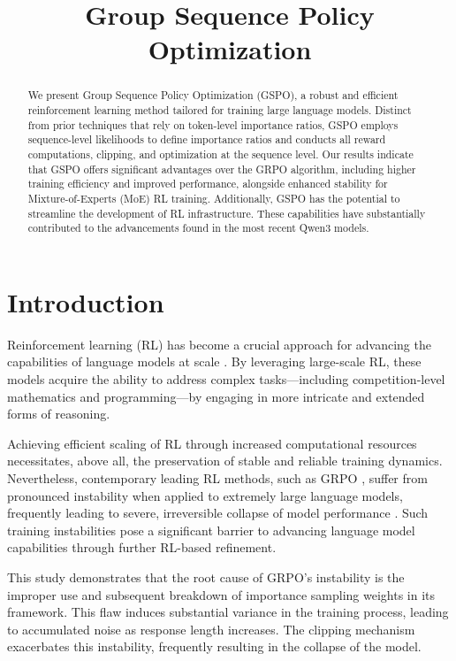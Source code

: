 \title{Group Sequence Policy Optimization}

\begin{abstract}
We present Group Sequence Policy Optimization (GSPO), a robust and efficient reinforcement learning method tailored for training large language models. Distinct from prior techniques that rely on token-level importance ratios, GSPO employs sequence-level likelihoods to define importance ratios and conducts all reward computations, clipping, and optimization at the sequence level. Our results indicate that GSPO offers significant advantages over the GRPO algorithm, including higher training efficiency and improved performance, alongside enhanced stability for Mixture-of-Experts (MoE) RL training. Additionally, GSPO has the potential to streamline the development of RL infrastructure. These capabilities have substantially contributed to the advancements found in the most recent Qwen3 models.
\end{abstract}

\section{Introduction}
\label{sec:intro}

Reinforcement learning (RL) has become a crucial approach for advancing the capabilities of language models at scale \citep{o1,dpsk-r1,qwq32b,qwen3}. By leveraging large-scale RL, these models acquire the ability to address complex tasks—including competition-level mathematics and programming—by engaging in more intricate and extended forms of reasoning.

Achieving efficient scaling of RL through increased computational resources necessitates, above all, the preservation of stable and reliable training dynamics. Nevertheless, contemporary leading RL methods, such as GRPO \citep{grpo}, suffer from pronounced instability when applied to extremely large language models, frequently leading to severe, irreversible collapse of model performance \citep{qwen3, minimax-m1}. Such training instabilities pose a significant barrier to advancing language model capabilities through further RL-based refinement.

This study demonstrates that the root cause of GRPO's instability is the improper use and subsequent breakdown of importance sampling weights in its framework. This flaw induces substantial variance in the training process, leading to accumulated noise as response length increases. The clipping mechanism exacerbates this instability, frequently resulting in the collapse of the model.

